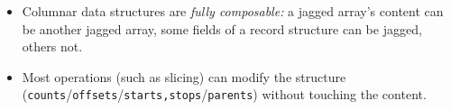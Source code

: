 \documentclass[aspectratio=169]{beamer}
\begin{document}
\begin{frame}{}
\Large
\vspace{1 cm}
\begin{itemize}\setlength{\itemsep}{0.5 cm}
\item<1-> Columnar data structures are {\it fully composable:} a jagged array's content can be another jagged array, some fields of a record structure can be jagged, others not.
\item<2-> Most operations (such as slicing) can modify the structure ({\tt counts}/{\tt offsets}/{\tt starts,stops}/{\tt parents}) without touching the content.
\end{itemize}
\end{frame}




\end{document}
